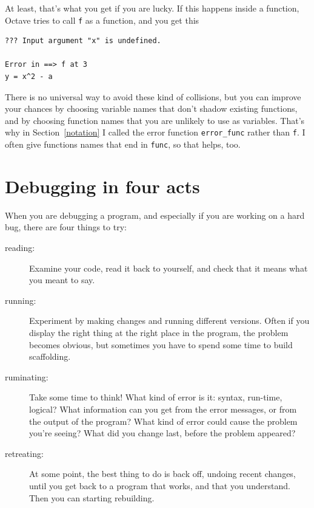 \documentclass{book}
\begin{document}
At least, that's what you get if you are lucky. If this happens
inside a function, Octave tries to call {\tt f} as a function,
and you get this

\begin{verbatim}
??? Input argument "x" is undefined.

Error in ==> f at 3
y = x^2 - a
\end{verbatim}

There is no universal way to avoid these kind of
collisions, but you can improve your chances by choosing
variable names that don't shadow existing functions, and by
choosing function names that you are unlikely to use as variables.
That's why in Section~\ref{notation} I called the error function
{\tt error\_func} rather than {\tt f}. I often give functions
names that end in {\tt func}, so that helps, too.


\section{Debugging in four acts}

When you are debugging a program, and especially if you are
working on a hard bug, there are four things to try:

\begin{description}

\item[reading:] Examine your code, read it back to yourself, and
check that it means what you meant to say.

\item[running:] Experiment by making changes and running different
versions. Often if you display the right thing at the right place
in the program, the problem becomes obvious, but sometimes you have to
spend some time to build scaffolding.

\item[ruminating:] Take some time to think! What kind of error
is it: syntax, run-time, logical? What information can you get from
the error messages, or from the output of the program? What kind of
error could cause the problem you're seeing? What did you change
last, before the problem appeared?

\item[retreating:] At some point, the best thing to do is back
off, undoing recent changes, until you get back to a program that
works, and that you understand. Then you can starting rebuilding.

\end{description}
\end{document}

